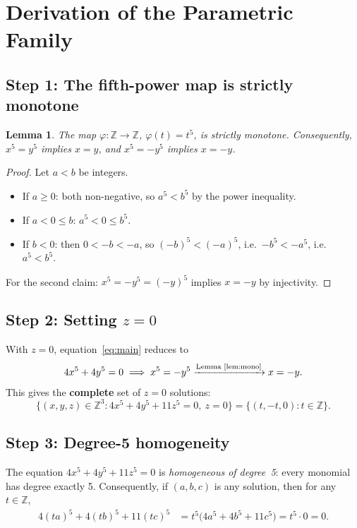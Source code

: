 \documentclass[12pt,a4paper]{article}
\newtheorem{lemma}[theorem]{Lemma}
\theoremstyle{definition}
\newcommand{\Z}{\mathbb{Z}}
\begin{document}
\section{Derivation of the Parametric Family}\label{sec:derivation}

\subsection{Step 1: The fifth-power map is strictly monotone}

\begin{lemma}\label{lem:mono}
  The map $\varphi\colon \Z \to \Z$, $\varphi(t) = t^5$, is strictly monotone.
  Consequently, $x^5 = y^5$ implies $x = y$, and $x^5 = -y^5$ implies $x = -y$.
\end{lemma}

\begin{proof}
  Let $a < b$ be integers.
  \begin{itemize}
    \item If $a \geq 0$: both non-negative, so $a^5 < b^5$ by the power inequality.
    \item If $a < 0 \leq b$: $a^5 < 0 \leq b^5$.
    \item If $b < 0$: then $0 < -b < -a$, so $(-b)^5 < (-a)^5$, i.e.\ $-b^5 < -a^5$,
          i.e.\ $a^5 < b^5$.
  \end{itemize}
  For the second claim: $x^5 = -y^5 = (-y)^5$ implies $x = -y$ by injectivity.
\end{proof}

\subsection{Step 2: Setting $z = 0$}

With $z = 0$, equation~\eqref{eq:main} reduces to
\[
  4x^5 + 4y^5 = 0 \implies x^5 = -y^5 \xrightarrow{\text{Lemma~\ref{lem:mono}}} x = -y.
\]
This gives the \textbf{complete} set of $z = 0$ solutions:
\[
  \{(x,y,z) \in \Z^3 : 4x^5+4y^5+11z^5=0,\ z=0\} = \{(t,-t,0) : t \in \Z\}.
\]

\subsection{Step 3: Degree-5 homogeneity}

The equation $4x^5 + 4y^5 + 11z^5 = 0$ is \emph{homogeneous of degree~5}: every
monomial has degree exactly 5.  Consequently, if $(a, b, c)$ is any solution, then
for any $t \in \Z$,
\begin{align}
  4(ta)^5 + 4(tb)^5 + 11(tc)^5
  &= t^5\bigl(4a^5 + 4b^5 + 11c^5\bigr) = t^5 \cdot 0 = 0.
\end{align}
\end{document}

